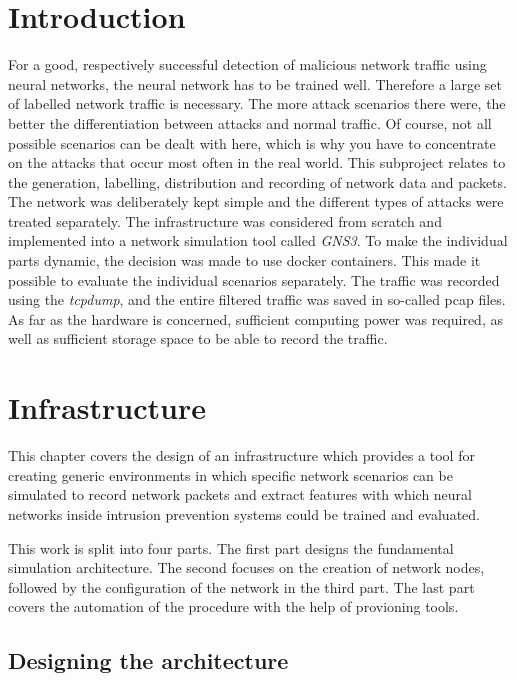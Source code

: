 \documentclass[conference]{IEEEtran}
\begin{document}
\section{Introduction}
For a good, respectively successful detection of malicious network traffic using neural networks, the neural network has to be trained well. Therefore a large set of labelled network traffic is necessary. The more attack scenarios there were, the better the differentiation between attacks and normal traffic. Of course, not all possible scenarios can be dealt with here, which is why you have to concentrate on the attacks that occur most often in the real world. This subproject relates to the generation, labelling, distribution and recording of network data and packets. The network was deliberately kept simple and the different types of attacks were treated separately. The infrastructure was considered from scratch and implemented into a network simulation tool called \textit{GNS3}. To make the individual parts dynamic, the decision was made to use docker containers. This made it possible to evaluate the individual scenarios separately. The traffic was recorded using the \textit{tcpdump}, and the entire filtered traffic was saved in so-called pcap files. As far as the hardware is concerned, sufficient computing power was required, as well as sufficient storage space to be able to record the traffic. 


\section{Infrastructure}

This chapter covers the design of an infrastructure which provides a tool for creating generic environments in which specific network scenarios can be simulated to record network packets and extract features with which neural networks inside intrusion prevention systems could be trained and evaluated.

This work is split into four parts. The first part designs the fundamental simulation architecture. The second focuses on the creation of network nodes, followed by the configuration of the network in the third part. The last part covers the automation of the procedure with the help of provioning tools.

\subsection{Designing the architecture}
\end{document}
